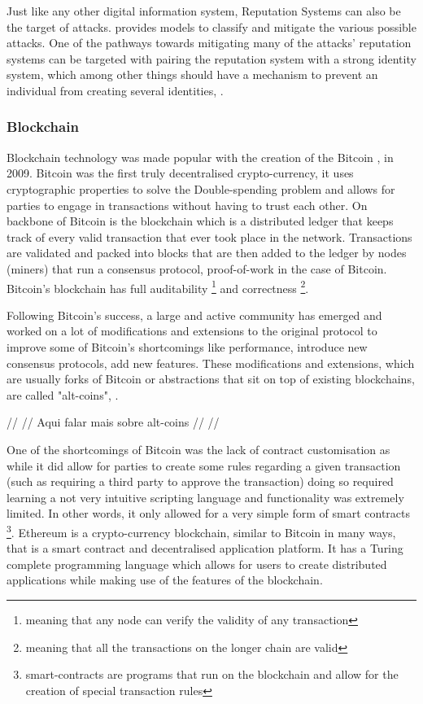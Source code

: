 \documentclass[llncsdoc]{llncs}
\begin{document}
Just like any other digital information system, Reputation Systems can also be the target of attacks. \cite{YanSun:2017jb} provides models to classify and mitigate the various possible attacks. One of the pathways towards mitigating many of the attacks' reputation systems can be targeted with pairing the reputation system with a strong identity system, which among other things should have a mechanism to prevent an individual from creating several identities, \cite{Hoffman:2009gm}.

\subsubsection{Blockchain}
Blockchain technology was made popular with the creation of the Bitcoin \cite{Anonymous:JOJGrvgg}, in 2009. Bitcoin was the first truly decentralised crypto-currency, it uses cryptographic properties to solve the Double-spending problem and allows for parties to engage in transactions without having to trust each other. On backbone of Bitcoin is the blockchain which is a distributed ledger that keeps track of every valid transaction that ever took place in the network. Transactions are validated and packed into blocks that are then added to the ledger by nodes (miners) that run a consensus protocol, proof-of-work in the case of Bitcoin. Bitcoin's blockchain has full auditability \footnote{meaning that any node can verify the validity of any transaction} and correctness \footnote{meaning that all the transactions on the longer chain are valid}.

Following Bitcoin's success, a large and active community has emerged and worked on a lot of modifications and extensions to the original protocol to improve some of Bitcoin's shortcomings like performance, introduce new consensus protocols, add new features. These modifications and extensions, which are usually forks of Bitcoin or abstractions that sit on top of existing blockchains, are called "alt-coins", \cite{Bonneau:2015ema}.

// // Aqui falar mais sobre alt-coins // //

One of the shortcomings of Bitcoin was the lack of contract customisation as while it did allow for parties to create some rules regarding a given transaction (such as requiring a third party to approve the transaction) doing so required learning a not very intuitive scripting language and functionality was extremely limited. In other words, it only allowed for a very simple form of smart contracts \footnote{smart-contracts are programs that run on the blockchain and allow for the creation of special transaction rules}. Ethereum is a crypto-currency blockchain, similar to Bitcoin in many ways, that is a smart contract and decentralised application platform. It has a Turing complete programming language which allows for users to create distributed applications while making use of the features of the blockchain.
\end{document}
